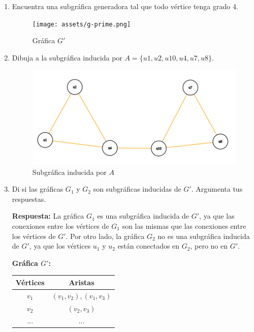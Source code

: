 \documentclass[12pt]{article}
\begin{document}
\begin{enumerate}
	\item Encuentra una subgráfica generadora tal que todo vértice tenga grado 4.
	      \begin{figure}[h]
		      \centering
		      \texttt{[image: assets/g-prime.png]}
		      \caption{Gráfica \( G' \)}
		      \label{fig:g-prime}
	      \end{figure}

	\item Dibuja a la subgráfica inducida por \( A = \{u1, u2, u10, u4, u7, u8\} \).
	      \begin{figure}[H]
		      \centering
		      \includegraphics[width=1\textwidth]{assets/induced-subgraph.png}
		      \caption{Subgráfica inducida por \( A \)}
		      \label{fig:induced-subgraph}
	      \end{figure}

	\item Di si las gráficas \( G_1 \) y \( G_2 \) son subgráficas inducidas de \( G' \). Argumenta tus respuestas.
	      \vspace{1em} %

	      \textbf{Respuesta:} La gráfica \( G_1 \) es una subgráfica inducida de \( G' \), ya que las conexiones entre los vértices de \( G_1 \) son las mismas que las conexiones entre los vértices de \( G' \). Por otro lado, la gráfica \( G_2 \) no es una subgráfica inducida de \( G' \), ya que los vértices \( u_1 \) y \( u_2 \) están conectados en \( G_2 \), pero no en \( G' \).
	      \vspace{1em} %

	      \textbf{Gráfica \( G' \):}
	      \begin{center}
		      \begin{tabular}{|c|c|}
			      \hline
			      Vértices  & Aristas                      \\
			      \hline
			      \( v_1 \) & \( (v_1, v_2), (v_1, v_3) \) \\
			      \( v_2 \) & \( (v_2, v_3) \)             \\
			      ...       & ...                          \\
			      \hline
		      \end{tabular}
	      \end{center}


\end{enumerate}
\end{document}
